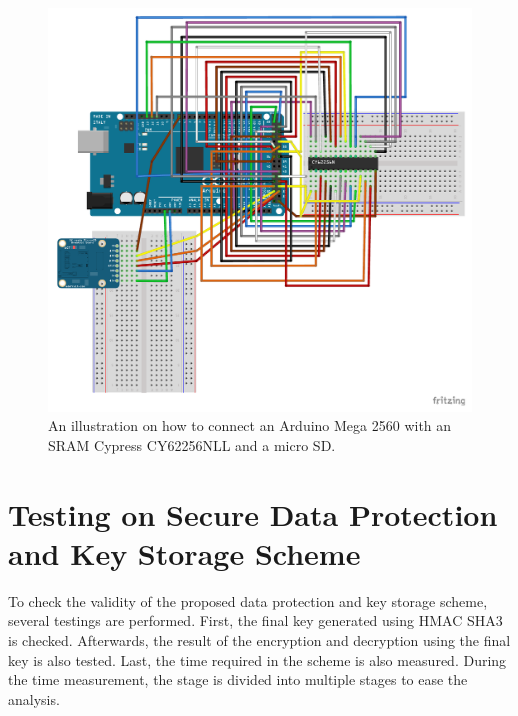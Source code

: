 \begin{figure}[tph!]
    \centerline{\includegraphics[width={\textwidth}]{images/CY62256-new-SD_bb}}
    \caption{An illustration on how to connect an Arduino Mega 2560 with an SRAM Cypress CY62256NLL and a micro SD.}
    \label{fig:cy62256nll_scheme_sd}
\end{figure}

\section{Testing on Secure Data Protection and Key Storage Scheme}\label{ch:testing_scheme}
To check the validity of the proposed data protection and key storage scheme, several testings are performed. First, the final key generated using HMAC SHA3 is checked. Afterwards, the result of the encryption and decryption using the final key is also tested. Last, the time required in the scheme is also measured. During the time measurement, the stage is divided into multiple stages to ease the analysis.

